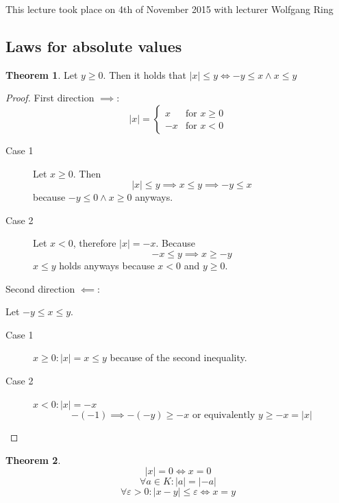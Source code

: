 \documentclass[a4paper,landscape,twocolumn]{article}
\theoremstyle{definition}
\newtheorem{theorem}{Theorem}
\newcommand\abs[1]{\left|#1\right|}
\newcommand\meta[3]{\begin{mdframed}[skipbelow=4pt,skipabove=4pt,innermargin=1pt,innerleftmargin=1pt,innerrightmargin=1pt]\begin{center}\small{\textdownarrow{} This #1 took place on #2 with lecturer #3}\end{center}\end{mdframed}}
\begin{document}
\meta{lecture}{4th of November 2015}{Wolfgang Ring}

\subsection{Laws for absolute values}
%
\begin{theorem}
  Let $y \geq 0$. Then it holds that $\abs{x} \leq y \iff -y \leq x \land x \leq y$
\end{theorem}
\begin{proof}
  First direction $\implies$:
  \[
    \abs{x} = \begin{cases}
      x & \text{for } x \geq 0\\
      -x & \text{for } x < 0
    \end{cases}
  \]
  \begin{description}
    \item[Case 1] Let $x \geq 0$. Then
      \[ \abs{x} \leq y \implies x \leq y \implies -y \leq x \]
      because $-y \leq 0 \land x \geq 0$ anyways.
    \item[Case 2] Let $x < 0$, therefore $\abs{x} = -x$. Because
      \[ -x \leq y \implies x \geq -y \]
      $x \leq y$ holds anyways because $x < 0$ and $y \geq 0$.
  \end{description}

  Second direction $\impliedby$:

  Let $-y \leq x \leq y$.
  \begin{description}
    \item[Case 1] $x \geq 0: \abs{x} = x \leq y$ because of the second inequality.
    \item[Case 2] $x < 0: \abs{x} = -x$
      \[ -(-1) \implies -(-y) \geq -x \text{ or equivalently } y \geq -x = \abs{x} \]
  \end{description}
\end{proof}

\begin{theorem}
  \[ \abs{x} = 0 \iff x = 0 \]
  \[ \forall a \in K: \abs{a} = \abs{-a} \]
  \[ \forall \varepsilon > 0: \abs{x - y} \leq \varepsilon \iff x = y \]
\end{theorem}
\end{document}
